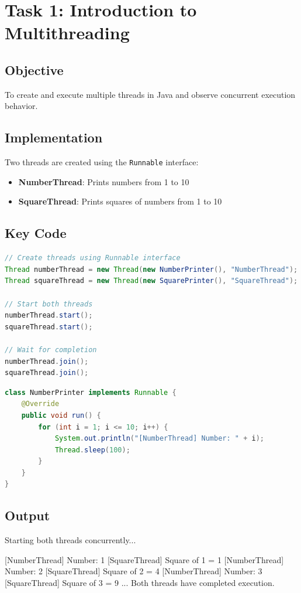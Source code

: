 \documentclass[12pt,a4paper]{article}
\let\oldverbatim\verbatim
\let\endoldverbatim\endverbatim
\renewenvironment{verbatim}
{
    \vspace{0.5em}
    \begin{framed}
    \noindent\oldverbatim
}
{
    \endoldverbatim
    \end{framed}
    \vspace{0.5em}
}
\begin{document}
\section{Task 1: Introduction to Multithreading}

\subsection{Objective}
To create and execute multiple threads in Java and observe concurrent execution behavior.

\subsection{Implementation}
Two threads are created using the \texttt{Runnable} interface:
\begin{itemize}
    \item \textbf{NumberThread}: Prints numbers from 1 to 10
    \item \textbf{SquareThread}: Prints squares of numbers from 1 to 10
\end{itemize}

\newpage
\subsection{Key Code}
\begin{lstlisting}[language=Java, caption=Thread Creation and Execution]
// Create threads using Runnable interface
Thread numberThread = new Thread(new NumberPrinter(), "NumberThread");
Thread squareThread = new Thread(new SquarePrinter(), "SquareThread");

// Start both threads
numberThread.start();
squareThread.start();

// Wait for completion
numberThread.join();
squareThread.join();
\end{lstlisting}

\begin{lstlisting}[language=Java, caption=NumberPrinter Runnable]
class NumberPrinter implements Runnable {
    @Override
    public void run() {
        for (int i = 1; i <= 10; i++) {
            System.out.println("[NumberThread] Number: " + i);
            Thread.sleep(100);
        }
    }
}
\end{lstlisting}

\subsection{Output}
\begin{verbatim}
Starting both threads concurrently...

[NumberThread] Number: 1
[SquareThread] Square of 1 = 1
[NumberThread] Number: 2
[SquareThread] Square of 2 = 4
[NumberThread] Number: 3
[SquareThread] Square of 3 = 9
...
Both threads have completed execution.
\end{verbatim}
\end{document}
